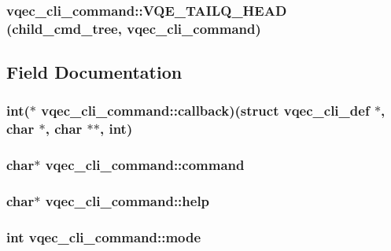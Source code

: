 \subsubsection{\setlength{\rightskip}{0pt plus 5cm}vqec\_\-cli\_\-command::VQE\_\-TAILQ\_\-HEAD (child\_\-cmd\_\-tree, \bf{vqec\_\-cli\_\-command})}\label{structvqec__cli__command_3f224cc8995960bcdf6c89f654050fab}




\subsection{Field Documentation}
\subsubsection{\setlength{\rightskip}{0pt plus 5cm}int($\ast$ \bf{vqec\_\-cli\_\-command::callback})(struct \bf{vqec\_\-cli\_\-def} $\ast$, char $\ast$, char $\ast$$\ast$, int)}\label{structvqec__cli__command_e0764dcd122211075869ca02f376f64b}


\subsubsection{\setlength{\rightskip}{0pt plus 5cm}char$\ast$ \bf{vqec\_\-cli\_\-command::command}}\label{structvqec__cli__command_b30b4ef94cdbf36f3c5cfdd8ef0a37a1}


\subsubsection{\setlength{\rightskip}{0pt plus 5cm}char$\ast$ \bf{vqec\_\-cli\_\-command::help}}\label{structvqec__cli__command_e78875295aaa41f0ba48c9b9e0316151}


\subsubsection{\setlength{\rightskip}{0pt plus 5cm}int \bf{vqec\_\-cli\_\-command::mode}}\label{structvqec__cli__command_ba8533f24bf47bd67ec6cba16cb25719}


